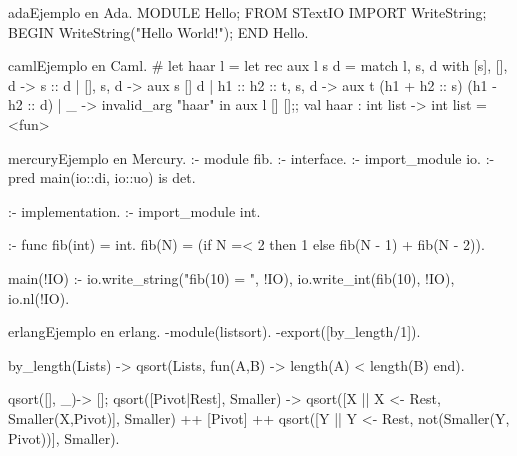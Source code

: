 
\begin{sourcecode}{ada}{Ejemplo en Ada.}
MODULE Hello;
FROM STextIO IMPORT WriteString;
BEGIN
  WriteString("Hello World!");
END Hello.
\end{sourcecode}

\begin{sourcecode}{caml}{Ejemplo en Caml.}
# let haar l =
   let rec aux l s d = 
     match l, s, d with
       [s], [], d -> s :: d
     | [], s, d -> aux s [] d
     | h1 :: h2 :: t, s, d -> aux t (h1 + h2 :: s) (h1 - h2 :: d)
     | _ -> invalid_arg "haar" 
     in aux l [] [];;
val haar : int list -> int list = <fun>
\end{sourcecode}

\begin{sourcecode}{mercury}{Ejemplo en Mercury.}
 :- module fib.
 :- interface.
 :- import_module io.
 :- pred main(io::di, io::uo) is det.
 
 :- implementation.
 :- import_module int.

 :- func fib(int) = int.
 fib(N) = (if N =< 2 then 1 else fib(N - 1) + fib(N - 2)).

 main(!IO) :-
        io.write_string("fib(10) = ", !IO),
        io.write_int(fib(10), !IO),
        io.nl(!IO).
\end{sourcecode}

\begin{sourcecode}{erlang}{Ejemplo en erlang.}
-module(listsort).
-export([by_length/1]).

by_length(Lists) -> %
   qsort(Lists, fun(A,B) -> length(A) < length(B) end).

qsort([], _)-> []; %
qsort([Pivot|Rest], Smaller) ->
    qsort([X || X <- Rest, Smaller(X,Pivot)], Smaller)
    ++ [Pivot] ++
    qsort([Y || Y <- Rest, not(Smaller(Y, Pivot))], Smaller).
\end{sourcecode}

